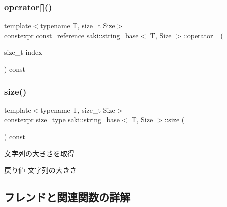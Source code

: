 \subsubsection{\texorpdfstring{operator[]()}{operator[]()}\hspace{0.1cm}{\footnotesize\ttfamily [2/2]}}
{\footnotesize\ttfamily template$<$typename T, size\+\_\+t Size$>$ \\
constexpr const\+\_\+reference \mbox{\hyperlink{classsaki_1_1string__base}{saki\+::string\+\_\+base}}$<$ T, Size $>$\+::operator\mbox{[}$\,$\mbox{]} (\begin{DoxyParamCaption}\item[{size\+\_\+t}]{index }\end{DoxyParamCaption}) const\hspace{0.3cm}{\ttfamily [inline]}}

\mbox{\label{classsaki_1_1string__base_ab243475d76d7abe879972787c590578e}} 
\subsubsection{\texorpdfstring{size()}{size()}}
{\footnotesize\ttfamily template$<$typename T, size\+\_\+t Size$>$ \\
constexpr size\+\_\+type \mbox{\hyperlink{classsaki_1_1string__base}{saki\+::string\+\_\+base}}$<$ T, Size $>$\+::size (\begin{DoxyParamCaption}{ }\end{DoxyParamCaption}) const\hspace{0.3cm}{\ttfamily [inline]}}



文字列の大きさを取得 

\begin{DoxyReturn}{戻り値}
文字列の大きさ 
\end{DoxyReturn}


\subsection{フレンドと関連関数の詳解}
\mbox{\label{classsaki_1_1string__base_af065456d5712bf52d3f09d973a6511ad}} 
